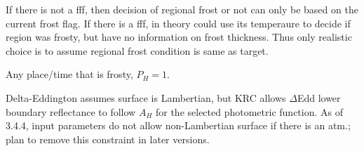  If there is not a fff, then decision of regional frost or not can only be based
 on the current frost flag. If there is a fff, in theory could use its
 temperaure to decide if region was frosty, but have no information on frost
 thickness. Thus only realistic choice is to assume regional frost condition is
 same as target.

Any place/time that is frosty, $P_H =1$.

 Delta-Eddington assumes surface is Lambertian, but KRC allows $\Delta$Edd lower
 boundary reflectance to follow $A_H$ for the selected photometric function. As
 of 3.4.4, input parameters do not allow non-Lambertian surface if there is an
 atm.; plan to remove this constraint in later versions.



